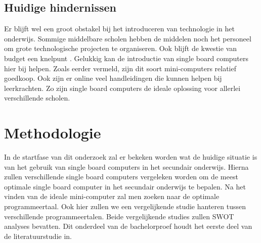 \subsection{Huidige hindernissen}
Er blijft wel een groot obstakel bij het introduceren van technologie in het onderwijs. Sommige middelbare scholen hebben de middelen noch het personeel om grote technologische projecten te organiseren. Ook blijft de kwestie van budget een knelpunt \autocite{Mouhamad2014}.
Gelukkig kan de introductie van single board computers hier bij helpen. Zoals eerder vermeld, zijn dit soort mini-computers relatief goedkoop. Ook zijn er online veel handleidingen die kunnen helpen bij leerkrachten. Zo zijn single board computers de ideale oplossing voor allerlei verschillende scholen.





\section{Methodologie}
\label{sec:methodologie}


In de startfase van dit onderzoek zal er bekeken worden wat de huidige situatie is van het gebruik van single board computers in het secundair onderwijs. Hierna zullen verschillende single board computers vergeleken worden om de meest optimale single board computer in het secundair onderwijs te bepalen. Na het vinden van de ideale mini-computer zal men zoeken naar de optimale programmeertaal. Ook hier zullen we een vergelijkende studie hanteren tussen verschillende programmeertalen. Beide vergelijkende studies zullen SWOT analyses bevatten. Dit onderdeel van de bachelorproef houdt het eerste deel van de literatuurstudie in.

